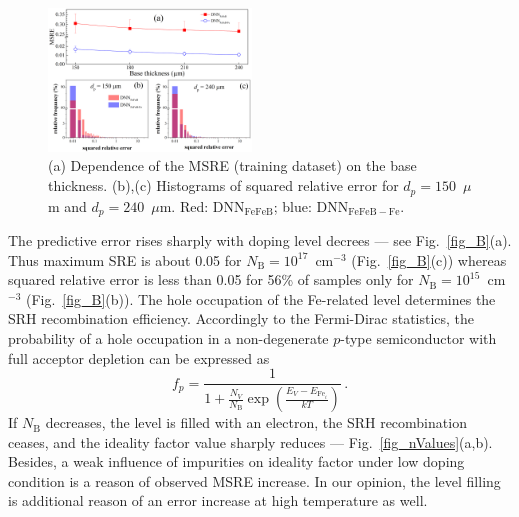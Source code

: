 \documentclass[a4paper,fleqn]{cas-sc}
\begin{document}
\begin{figure}[tb]
\centering
\includegraphics[width=0.48\textwidth]{F5}
\caption{(a) Dependence of the MSRE (training dataset) on the base thickness.
(b),(c) Histograms of squared relative error for $d_p=150$~$\mu$m and $d_p=240$~$\mu$m.
Red: DNN$_\mathrm{FeFeB}$; blue: DNN$_\mathrm{FeFeB-Fe}$.}
\label{fig_depth}
\end{figure}

The predictive error rises sharply with doping level decrees --- see Fig.~\ref{fig_B}(a).
Thus maximum SRE is about 0.05 for $N_\mathrm{B}=10^{17}$~cm$^{-3}$ (Fig.~\ref{fig_B}(c))
whereas squared relative error is less than 0.05 for 56\% of samples only
for $N_\mathrm{B}=10^{15}$~cm$^{-3}$ (Fig.~\ref{fig_B}(b)).
The hole occupation of the Fe-related level determines the SRH recombination efficiency.
Accordingly to the Fermi-Dirac statistics, the probability of a hole
occupation in a non-degenerate $p$-type semiconductor with full acceptor depletion can be expressed as
\begin{equation}
\label{eqfp}
 f_p=\frac{1}{1+\frac{N_V}{N_\mathrm{B}}\exp\left(\frac{E_V-E_{\mathrm{Fe}_i}}{kT}\right)}\,.
\end{equation}
If $N_\mathrm{B}$ decreases, the level is filled with an electron,
the SRH recombination ceases, and the ideality factor value sharply reduces  --- Fig.~\ref{fig_nValues}(a,b).
Besides, a weak influence of impurities on ideality factor under low doping condition is a reason
of observed MSRE increase.
In our opinion, the level filling is additional reason of an error increase at high temperature as well.


\end{document}
